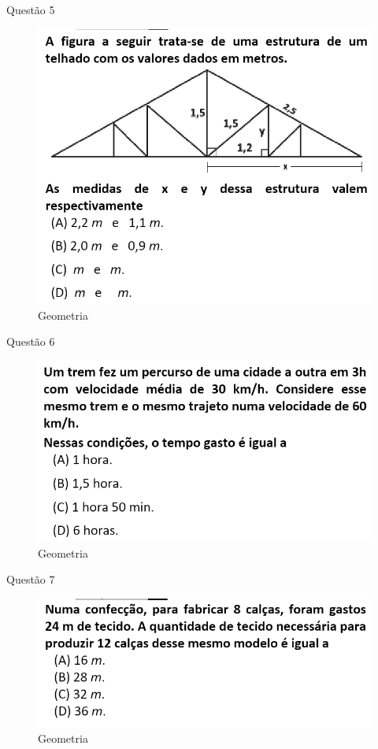 \documentclass{beamer}
\begin{document}
\begin{frame}{Questão 5}
    \begin{figure}
        \caption{Geometria}
        \includegraphics[scale=0.6]{qst20.37.png}
    \end{figure}
\end{frame}
\begin{frame}{Questão 6}
    \begin{figure}
        \caption{Geometria}
        \includegraphics[scale=0.8]{qst20.55.png}
    \end{figure}
\end{frame}
\begin{frame}{Questão 7}
    \begin{figure}
        \caption{Geometria}
        \includegraphics[scale=0.8]{qst21.23.png}
    \end{figure}
\end{frame}
\end{document}
